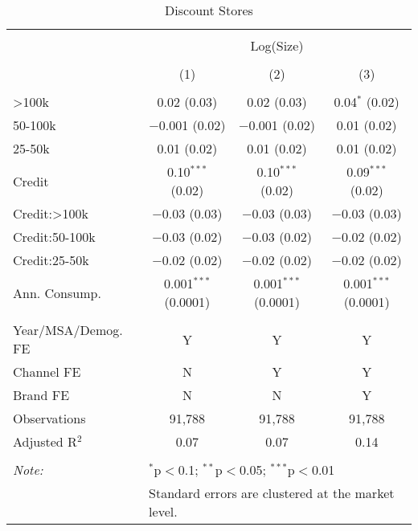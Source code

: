 
\begin{table}[!htbp] \centering 
  \caption{Discount Stores} 
  \label{tab:packageSizeDiscountDetergent} 
\begin{tabular}{@{\extracolsep{5pt}}lccc} 
\\[-1.8ex]\hline 
\hline \\[-1.8ex] 
 & \multicolumn{3}{c}{Log(Size)} \\ 
\\[-1.8ex] & (1) & (2) & (3)\\ 
\hline \\[-1.8ex] 
 >100k & 0.02 (0.03) & 0.02 (0.03) & 0.04$^{*}$ (0.02) \\ 
  50-100k & $-$0.001 (0.02) & $-$0.001 (0.02) & 0.01 (0.02) \\ 
  25-50k & 0.01 (0.02) & 0.01 (0.02) & 0.01 (0.02) \\ 
  Credit & 0.10$^{***}$ (0.02) & 0.10$^{***}$ (0.02) & 0.09$^{***}$ (0.02) \\ 
  Credit:>100k & $-$0.03 (0.03) & $-$0.03 (0.03) & $-$0.03 (0.03) \\ 
  Credit:50-100k & $-$0.03 (0.02) & $-$0.03 (0.02) & $-$0.02 (0.02) \\ 
  Credit:25-50k & $-$0.02 (0.02) & $-$0.02 (0.02) & $-$0.02 (0.02) \\ 
  Ann. Consump. & 0.001$^{***}$ (0.0001) & 0.001$^{***}$ (0.0001) & 0.001$^{***}$ (0.0001) \\ 
 \hline \\[-1.8ex] 
Year/MSA/Demog. FE & Y & Y & Y \\ 
Channel FE & N & Y & Y \\ 
Brand FE & N & N & Y \\ 
Observations & 91,788 & 91,788 & 91,788 \\ 
Adjusted R$^{2}$ & 0.07 & 0.07 & 0.14 \\ 
\hline 
\hline \\[-1.8ex] 
\textit{Note:}  & \multicolumn{3}{l}{$^{*}$p$<$0.1; $^{**}$p$<$0.05; $^{***}$p$<$0.01} \\ 
 & \multicolumn{3}{l}{Standard errors are clustered at the market level.} \\ 
\end{tabular} 
\end{table} 
